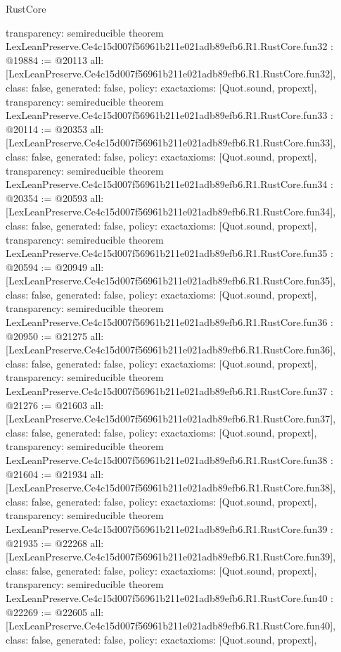 \begin{lexlean}{RustCore}
\begin{coremodule}
{  transparency: semireducible
}
theorem LexLeanPreserve.Ce4c15d007f56961b211e021adb89efb6.R1.RustCore.fun32 : @19884 := @20113 {
  all: [LexLeanPreserve.Ce4c15d007f56961b211e021adb89efb6.R1.RustCore.fun32],
  class: false,
  generated: false,
  policy: exact{axioms: [Quot.sound, propext]},
  transparency: semireducible
}
theorem LexLeanPreserve.Ce4c15d007f56961b211e021adb89efb6.R1.RustCore.fun33 : @20114 := @20353 {
  all: [LexLeanPreserve.Ce4c15d007f56961b211e021adb89efb6.R1.RustCore.fun33],
  class: false,
  generated: false,
  policy: exact{axioms: [Quot.sound, propext]},
  transparency: semireducible
}
theorem LexLeanPreserve.Ce4c15d007f56961b211e021adb89efb6.R1.RustCore.fun34 : @20354 := @20593 {
  all: [LexLeanPreserve.Ce4c15d007f56961b211e021adb89efb6.R1.RustCore.fun34],
  class: false,
  generated: false,
  policy: exact{axioms: [Quot.sound, propext]},
  transparency: semireducible
}
theorem LexLeanPreserve.Ce4c15d007f56961b211e021adb89efb6.R1.RustCore.fun35 : @20594 := @20949 {
  all: [LexLeanPreserve.Ce4c15d007f56961b211e021adb89efb6.R1.RustCore.fun35],
  class: false,
  generated: false,
  policy: exact{axioms: [Quot.sound, propext]},
  transparency: semireducible
}
theorem LexLeanPreserve.Ce4c15d007f56961b211e021adb89efb6.R1.RustCore.fun36 : @20950 := @21275 {
  all: [LexLeanPreserve.Ce4c15d007f56961b211e021adb89efb6.R1.RustCore.fun36],
  class: false,
  generated: false,
  policy: exact{axioms: [Quot.sound, propext]},
  transparency: semireducible
}
theorem LexLeanPreserve.Ce4c15d007f56961b211e021adb89efb6.R1.RustCore.fun37 : @21276 := @21603 {
  all: [LexLeanPreserve.Ce4c15d007f56961b211e021adb89efb6.R1.RustCore.fun37],
  class: false,
  generated: false,
  policy: exact{axioms: [Quot.sound, propext]},
  transparency: semireducible
}
theorem LexLeanPreserve.Ce4c15d007f56961b211e021adb89efb6.R1.RustCore.fun38 : @21604 := @21934 {
  all: [LexLeanPreserve.Ce4c15d007f56961b211e021adb89efb6.R1.RustCore.fun38],
  class: false,
  generated: false,
  policy: exact{axioms: [Quot.sound, propext]},
  transparency: semireducible
}
theorem LexLeanPreserve.Ce4c15d007f56961b211e021adb89efb6.R1.RustCore.fun39 : @21935 := @22268 {
  all: [LexLeanPreserve.Ce4c15d007f56961b211e021adb89efb6.R1.RustCore.fun39],
  class: false,
  generated: false,
  policy: exact{axioms: [Quot.sound, propext]},
  transparency: semireducible
}
theorem LexLeanPreserve.Ce4c15d007f56961b211e021adb89efb6.R1.RustCore.fun40 : @22269 := @22605 {
  all: [LexLeanPreserve.Ce4c15d007f56961b211e021adb89efb6.R1.RustCore.fun40],
  class: false,
  generated: false,
  policy: exact{axioms: [Quot.sound, propext]},
}
\end{coremodule}
\end{lexlean}
